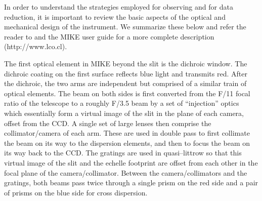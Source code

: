 \documentclass[]{emulateapj}
\begin{document}
In order to understand the strategies employed for observing and
for data reduction,
it is important to review the basic aspects of the optical and
mechanical design of the instrument.  We summarize  these below and
refer the reader to \cite{mike} and the MIKE user guide for
a more complete description
(http://www.lco.cl).

The first optical element in MIKE beyond the slit is the dichroic
window.  The dichroic coating on the first surface reflects blue light
and transmits red.  After the dichroic, the two arms are independent
but comprised of a similar train of optical elements.  The beam on
both sides is first converted from the F/11 focal ratio of the
telescope to a roughly F/3.5 beam by a set of ``injection'' optics
which essentially form a virtual image of the slit in the plane of each
camera, offset from the CCD.  A single set of large lenses then
comprise the collimator/camera of each arm.  These are used in double
pass to first collimate the beam on its way to the dispersion elements,
and then to focus the beam on its way back to the CCD.  The gratings are used
in quasi--littrow so that this virtual image of the slit 
and the echelle footprint are offset from each other in the focal plane of the
camera/collimator. Between the camera/collimators and the gratings,
both beams pass twice through a single prism on the red side and a
pair of prisms on the blue side for cross dispersion.

%

\end{document}

